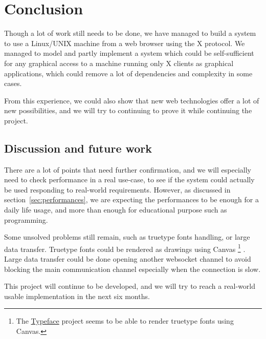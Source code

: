 \chapter{Conclusion}
Though a lot of work still needs to be done, we have managed to 
build a system to use a Linux/UNIX machine from a web browser 
using the X protocol. 
We managed to model and partly implement a system which could be 
self-sufficient for any graphical access to a machine running only 
X clients as graphical applications, which could remove a lot of 
dependencies and complexity in some cases.

From this experience, we could also show that new web technologies 
offer a lot of new possibilities, and we will try to continuing to prove it 
while continuing the project.
%
\section{Discussion and future work}
There are a lot of points that need further confirmation, and we will
especially need to check performance in a real use-case, to see 
if the system could actually be used responding to real-world requirements.
However, as discussed in section~\ref{sec:performances}, we are expecting 
the performances to be enough for a daily life usage, and more than enough 
for educational purpose such as programming.

Some unsolved problems still remain, such as truetype fonts handling, 
or large data transfer. Truetype fonts could be rendered as drawings using 
Canvas
\footnote{The \href{http://typeface.neocracy.org/}{Typeface} project seems to be able to render truetype fonts using Canvas.}
. Large data transfer could be done opening another websocket channel 
to avoid blocking the main communication channel especially when the 
connection is slow.

This project will continue to be developed, and we will try to reach 
a real-world usable implementation in the next six months.
